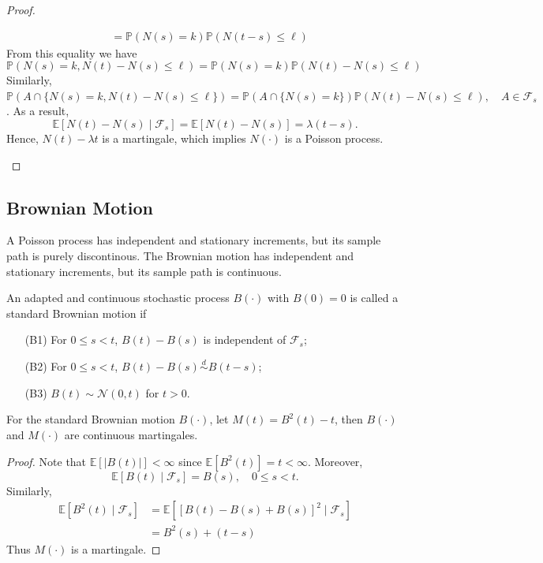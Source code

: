\begin{proof}
\begin{itemize}
\begin{align*}
&=\mathbb{P}(N(s)=k)\mathbb{P}(N(t-s)\le\ell)
\end{align*}
From this equality we have 
\[
\mathbb{P}(N(s)=k, N(t)-N(s)\le \ell)=
\mathbb{P}(N(s)=k) \mathbb{P}(N(t)-N(s)\le \ell)
\]
Similarly, $\mathbb{P}(A\cap \{N(s)=k, N(t)-N(s)\le \ell\}) = \mathbb{P}(A\cap\{N(s)=k\})
\mathbb{P}(N(t)-N(s)\le\ell),\quad A\in\mathcal{F}_s
$.
As a result,
\[
\mathbb{E}[N(t)-N(s)\mid\mathcal{F}_s] = \mathbb{E}[N(t) - N(s)]=\lambda(t-s).
\]
Hence, $N(t)-\lambda t$ is a martingale, which implies $N(\cdot)$ is a Poisson process.
\end{itemize}
\end{proof}

\subsection{Brownian Motion}
A Poisson process has independent and stationary increments, but its sample path is purely discontinous.
The Brownian motion has independent and stationary increments, but its sample path is continuous.

\begin{definition}
An adapted and continuous stochastic process $B(\cdot)$ with $B(0)=0$ is called a standard Brownian motion if
\begin{enumerate}
\item[(B1)]
For $0\le s<t$, $B(t)-B(s)$ is independent of $\mathcal{F}_s$;
\item[(B2)]
For $0\le s<t$, $B(t)-B(s)\overset{d}{\sim}B(t-s)$;
\item[(B3)]
$B(t)\sim \mathcal{N}(0,t)$ for $t>0$.
\end{enumerate}
\end{definition}

\begin{proposition}
For the standard Brownian motion $B(\cdot)$, let $M(t)=B^2(t)-t$, then
$B(\cdot)$ and $M(\cdot)$ are continuous martingales.
\end{proposition}
\begin{proof}
Note that $\mathbb{E}[|B(t)|]<\infty$ since $\mathbb{E}[B^2(t)]=t<\infty$.
Moreover,
\[
\mathbb{E}[B(t)\mid\mathcal{F}_s]=B(s),\quad 0\le s<t.
\]
Similarly, 
\begin{align*}
\mathbb{E}[B^2(t)\mid\mathcal{F}_s]&=
\mathbb{E}[[B(t) - B(s)+B(s)]^2\mid\mathcal{F}_s]\\
&=B^2(s) + (t-s)
\end{align*}
Thus $M(\cdot)$ is a martingale.
\end{proof}

